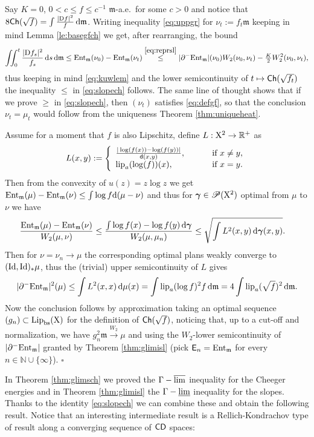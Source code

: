 \documentclass[11pt]{article}
\numberwithin{equation}{section}
\newenvironment{idea}{\removelastskip\par\medskip   %
\noindent{\em Idea of the proof} \rm}{\penalty-20\null\hfill$\square$\par\medbreak}
\newcommand{\N}{\mathbb{N}}
\newcommand{\R}{\mathbb{R}}
\newcommand{\ggamma}{{\mbox{\boldmath$\gamma$}}}
\newcommand{\pr}{\mathscr P}
\newcommand{\X}{{\rm X}}
\newcommand{\sfd}{{\sf d}}
\newcommand{\mm}{{\mathfrak m}}
\newcommand{\CD}{{\sf CD}}
\newcommand{\ch}{{\sf Ch}}
\newcommand{\ent}{{\rm Ent}_\mm}
\renewcommand{\d}{{\rm d}}
\newcommand{\D}{{\rm D}}
\newcommand{\Lip}{{\rm Lip}}
\newcommand{\lipa}{{\rm lip}_a}
\newcommand{\lims}{\varlimsup}
\newcommand{\limi}{\varliminf}
\newcommand{\bs}{{\rm bs}}
\newcommand{\Id}{{\rm Id}}
\newcommand{\E}{{\sf E}} %
\DeclareMathOperator*{\glimi}{{\Gamma-\limi}}
\DeclareMathOperator*{\glims}{\Gamma-\lims}
\begin{document}
\begin{idea} Say $K=0$, $0<c\leq f\leq c^{-1} $ $\mm$-a.e.\ for some $c>0$ and notice that $8\ch(\sqrt{f})=\int\frac{|\D f|^2}{f}\,\d\mm$. Writing inequality \eqref{eq:uppgr} for $\nu_t:=f_t\mm$ keeping in mind Lemma \ref{le:basegfch} we get, after rearranging, the bound
\[
\iint_0^t\frac{|\D f_s|^2}{f_s}\,\d s\,\d\mm\leq \ent(\nu_0)-\ent(\nu_t)\stackrel{\eqref{eq:reprsl}}\leq|\partial^-\ent|(\nu_0)W_2(\nu_0,\nu_t)-\tfrac K2W^2_2(\nu_0,\nu_t),
\]
thus keeping in mind \eqref{eq:kuwlem} and the lower semicontinuity of $t\mapsto\ch(\sqrt{f_t})$ the inequality  $\leq$ in \eqref{eq:slopech} follows.  The same line of thought shows that if we prove $\geq$ in \eqref{eq:slopech}, then $(\nu_t)$ satisfies \eqref{eq:defgf}, so that the conclusion $\nu_t=\mu_t$ would follow from the uniqueness Theorem \ref{thm:uniqueheat}.

Assume for a moment that $f$ is also Lipschitz, define $L:\X^2\to\R^+$ as
\[
L(x,y):=\left\{\begin{array}{ll}
\tfrac{|\log(f(x))-\log(f(y))|}{\sfd(x,y)},&\qquad\text{ if }x\neq y,\\
\lipa(\log(f))(x),&\qquad\text{ if }x=y.
\end{array}\right.
\]
Then from the convexity of $u(z)=z\log z$ we get $\ent(\mu)-\ent(\nu)\leq \int\log f\d(\mu-\nu)$ and thus for $\ggamma\in\pr(\X^2)$ optimal from $\mu$ to $\nu$  we have
\[
\begin{split}
\frac{\ent(\mu)-\ent(\nu)}{W_2(\mu,\nu)}&\leq\frac{\int \log f(x)-\log f(y)\,\d\ggamma}{W_2(\mu,\mu_n)}\leq \sqrt{\int L^2(x,y)\,\d\ggamma(x,y)}.
\end{split}
\]
Then for $\nu=\nu_n\to\mu$ the corresponding optimal plans weakly converge to  $(\Id,\Id)_*\mu$, thus the (trivial) upper semicontinuity of $L$ gives
\[
|\partial^-\ent|^2(\mu)\leq \int L^2(x,x)\,\d\mu(x)=\int \lipa(\log f)^2 f\,\d\mm=4\int \lipa(\sqrt f)^2\,\d\mm.
\]
Now the conclusion follows by approximation taking an optimal sequence $(g_n)\subset \Lip_\bs(\X)$ for the definition of $\ch(\sqrt f)$, noticing that, up to a cut-off and normalization, we have $g_n^2\mm\stackrel{W_2}\to\mu$  and using the $W_2$-lower semicontinuity of $|\partial^-\ent|$ granted by Theorem \ref{thm:glimisl} (pick $\E_n=\ent$ for every $n\in \N\cup\{\infty\}$).
\end{idea}
In Theorem \ref{thm:glimsch} we proved the $\glims$ inequality for the Cheeger energies and in Theorem \ref{thm:glimisl} the $\glimi$ inequality for the slopes. Thanks to the identity \eqref{eq:slopech} we can combine these and obtain the following result. Notice that an interesting intermediate result is a Rellich-Kondrachov type of result along a converging sequence of $\CD$ spaces:
\end{document}
